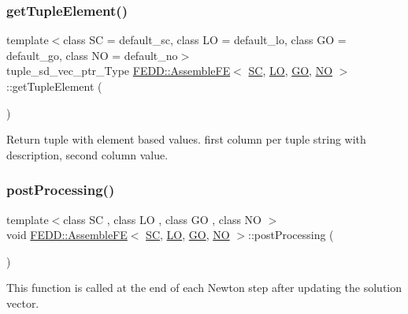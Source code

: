 \subsubsection{\texorpdfstring{get\+Tuple\+Element()}{getTupleElement()}}
{\footnotesize\ttfamily template$<$class SC  = default\+\_\+sc, class LO  = default\+\_\+lo, class GO  = default\+\_\+go, class NO  = default\+\_\+no$>$ \\
tuple\+\_\+sd\+\_\+vec\+\_\+ptr\+\_\+\+Type \hyperlink{classFEDD_1_1AssembleFE}{F\+E\+D\+D\+::\+Assemble\+FE}$<$ \hyperlink{fe__test__laplace_8cpp_a79c7e86a57edbb2a5a53242bcd04e41e}{SC}, \hyperlink{fe__test__laplace_8cpp_ad6a38c9f07d3fd633eefca5bccad8410}{LO}, \hyperlink{fe__test__laplace_8cpp_afa2946b509009b4f45eb04bd8c5b27d9}{GO}, \hyperlink{fe__test__laplace_8cpp_a5e24f37b28787429872b6ecb1d0417ce}{NO} $>$\+::get\+Tuple\+Element (\begin{DoxyParamCaption}{ }\end{DoxyParamCaption})}



Return tuple with element based values. first column per tuple string with description, second column value. 

\mbox{\label{classFEDD_1_1AssembleFE_a8ae32f71020082d81b055afbeda6fc29}} 
\subsubsection{\texorpdfstring{post\+Processing()}{postProcessing()}}
{\footnotesize\ttfamily template$<$class SC , class LO , class GO , class NO $>$ \\
void \hyperlink{classFEDD_1_1AssembleFE}{F\+E\+D\+D\+::\+Assemble\+FE}$<$ \hyperlink{fe__test__laplace_8cpp_a79c7e86a57edbb2a5a53242bcd04e41e}{SC}, \hyperlink{fe__test__laplace_8cpp_ad6a38c9f07d3fd633eefca5bccad8410}{LO}, \hyperlink{fe__test__laplace_8cpp_afa2946b509009b4f45eb04bd8c5b27d9}{GO}, \hyperlink{fe__test__laplace_8cpp_a5e24f37b28787429872b6ecb1d0417ce}{NO} $>$\+::post\+Processing (\begin{DoxyParamCaption}{ }\end{DoxyParamCaption})}



This function is called at the end of each Newton step after updating the solution vector. 

